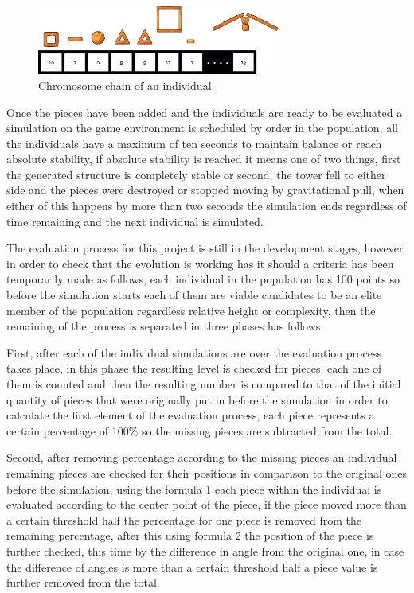 \documentclass[conference]{IEEEtran}
\begin{document}
\begin{figure}[htbp]
\centerline{\includegraphics[width=80mm]{Images/chromosome_chain_example.png}}
\caption{Chromosome chain of an individual.}
\label{old_chrom}
\end{figure}

Once the pieces have been added and the individuals are ready to be evaluated a
simulation on the game environment is scheduled by order in the population, all
the individuals have a maximum of ten seconds to maintain balance or reach
absolute stability, if absolute stability is reached it means one of two things,
first the generated structure is completely stable or second, the tower fell to
either side and the pieces were destroyed or stopped moving by gravitational
pull, when either of this happens by more than two seconds the simulation ends
regardless of time remaining and the next individual is simulated.

The evaluation process for this project is still in the development stages,
however in order to check that the evolution is working has it should a criteria
has been temporarily made as follows, each individual in the population has 100
points so before the simulation starts each of them are viable candidates to be
an elite member of the population regardless relative height or complexity, then
the remaining of the process is separated in three phases has follows.

First, after each of the individual simulations are over the evaluation process
takes place, in this phase the resulting level is checked for pieces, each one
of them is counted and then the resulting number is compared to that of the
initial quantity of pieces that were originally put in before the simulation in
order to calculate the first element of the evaluation process, each piece
represents a certain percentage of 100\% so the missing pieces are subtracted
from the total.

Second, after removing percentage according to the missing pieces an individual
remaining pieces are checked for their positions in comparison to the original
ones before the simulation, using the formula 1 each piece within the individual
is evaluated according to the center point of the piece, if the piece moved more
than a certain threshold half the percentage for one piece is removed from the
remaining percentage, after this using formula 2 the position of the piece
is further checked, this time by the difference in angle from the original one,
in case the difference of angles is more than a certain threshold half a piece
value is further removed from the total.
\end{document}
